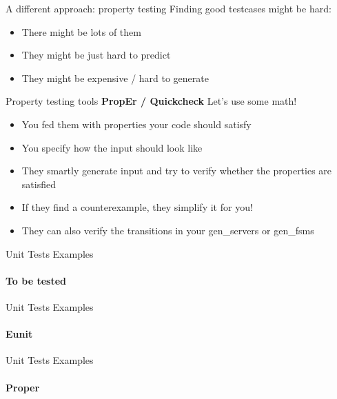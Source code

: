 \documentclass[aspectratio=169]{beamer}
\begin{document}
\begin{frame}{A different approach: property testing}
    Finding good testcases might be hard:
    \begin{itemize}
    \item There might be lots of them
    \item They might be just hard to predict
    \item They might be expensive / hard to generate
    \end{itemize}
\end{frame}

\begin{frame}{Property testing tools}
    \textbf{PropEr / Quickcheck} Let's use some math!
    \begin{itemize}
    \item You fed them with properties your code should satisfy
    \item You specify how the input should look like
    \item They smartly generate input and try to verify whether the properties are satisfied
    \item If they find a counterexample, they simplify it for you!
    \item They can also verify the transitions in your gen\_servers or gen\_fsms
    \end{itemize}
\end{frame}

\begin{frame}{Unit Tests Examples}
    \framesubtitle{To be tested}
    
\end{frame}

\begin{frame}{Unit Tests Examples}
    \framesubtitle{Eunit}
    
\end{frame}

\begin{frame}{Unit Tests Examples}
    \framesubtitle{Proper}
    
\end{frame}
\end{document}
